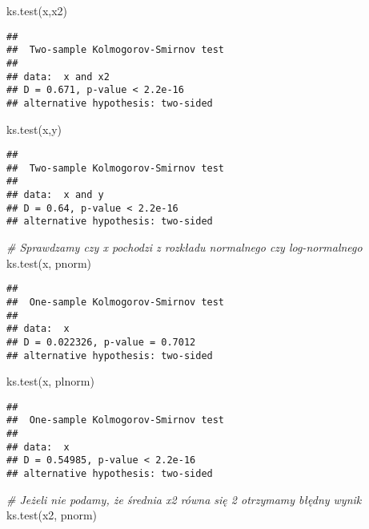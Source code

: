 \documentclass[
]{book}
\newenvironment{Shaded}{\begin{snugshade}}{\end{snugshade}}
\newcommand{\CommentTok}[1]{\textcolor[rgb]{0.56,0.35,0.01}{\textit{#1}}}
\newcommand{\FunctionTok}[1]{\textcolor[rgb]{0.00,0.00,0.00}{#1}}
\newcommand{\NormalTok}[1]{#1}
\begin{document}
\begin{Shaded}
\begin{Highlighting}[]
\FunctionTok{ks.test}\NormalTok{(x,x2)}
\end{Highlighting}
\end{Shaded}

\begin{verbatim}
## 
##  Two-sample Kolmogorov-Smirnov test
## 
## data:  x and x2
## D = 0.671, p-value < 2.2e-16
## alternative hypothesis: two-sided
\end{verbatim}

\begin{Shaded}
\begin{Highlighting}[]
\FunctionTok{ks.test}\NormalTok{(x,y)}
\end{Highlighting}
\end{Shaded}

\begin{verbatim}
## 
##  Two-sample Kolmogorov-Smirnov test
## 
## data:  x and y
## D = 0.64, p-value < 2.2e-16
## alternative hypothesis: two-sided
\end{verbatim}

\begin{Shaded}
\begin{Highlighting}[]
\CommentTok{\# Sprawdzamy czy x pochodzi z rozkładu normalnego czy log{-}normalnego}
\FunctionTok{ks.test}\NormalTok{(x, pnorm)}
\end{Highlighting}
\end{Shaded}

\begin{verbatim}
## 
##  One-sample Kolmogorov-Smirnov test
## 
## data:  x
## D = 0.022326, p-value = 0.7012
## alternative hypothesis: two-sided
\end{verbatim}

\begin{Shaded}
\begin{Highlighting}[]
\FunctionTok{ks.test}\NormalTok{(x, plnorm)}
\end{Highlighting}
\end{Shaded}

\begin{verbatim}
## 
##  One-sample Kolmogorov-Smirnov test
## 
## data:  x
## D = 0.54985, p-value < 2.2e-16
## alternative hypothesis: two-sided
\end{verbatim}

\begin{Shaded}
\begin{Highlighting}[]
\CommentTok{\# Jeżeli nie podamy, że średnia x2 równa się 2 otrzymamy błędny wynik}
\FunctionTok{ks.test}\NormalTok{(x2, pnorm)}
\end{Highlighting}
\end{Shaded}
\end{document}
